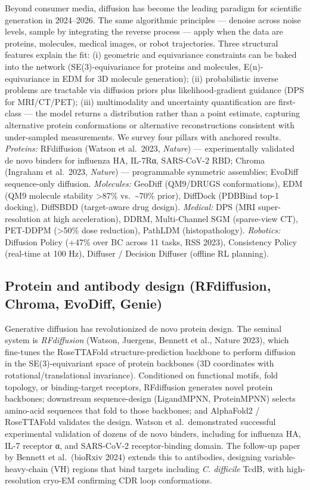Beyond consumer media, diffusion has become the leading paradigm for scientific generation in 2024--2026. The same algorithmic principles --- denoise across noise levels, sample by integrating the reverse process --- apply when the data are proteins, molecules, medical images, or robot trajectories. Three structural features explain the fit: (i) geometric and equivariance constraints can be baked into the network (SE(3)-equivariance for proteins and molecules, E(n)-equivariance in EDM for 3D molecule generation); (ii) probabilistic inverse problems are tractable via diffusion priors plus likelihood-gradient guidance (DPS for MRI/CT/PET); (iii) multimodality and uncertainty quantification are first-class --- the model returns a distribution rather than a point estimate, capturing alternative protein conformations or alternative reconstructions consistent with under-sampled measurements. We survey four pillars with anchored results. \emph{Proteins:} RFdiffusion (Watson et al.~2023, \emph{Nature}) --- experimentally validated de novo binders for influenza HA, IL-7Rα, SARS-CoV-2 RBD; Chroma (Ingraham et al.~2023, \emph{Nature}) --- programmable symmetric assemblies; EvoDiff sequence-only diffusion. \emph{Molecules:} GeoDiff (QM9/DRUGS conformations), EDM (QM9 molecule stability \textgreater87\% vs.~\textasciitilde70\% prior), DiffDock (PDBBind top-1 docking), DiffSBDD (target-aware drug design). \emph{Medical:} DPS (MRI super-resolution at high acceleration), DDRM, Multi-Channel SGM (sparse-view CT), PET-DDPM (\textgreater50\% dose reduction), PathLDM (histopathology). \emph{Robotics:} Diffusion Policy (+47\% over BC across 11 tasks, RSS 2023), Consistency Policy (real-time at 100 Hz), Diffuser / Decision Diffuser (offline RL planning).

\subsection{Protein and antibody design (RFdiffusion, Chroma, EvoDiff, Genie)}\label{protein-and-antibody-design-rfdiffusion-chroma-evodiff-genie}

Generative diffusion has revolutionized de novo protein design. The seminal system is \emph{RFdiffusion} (Watson, Juergens, Bennett et al., Nature 2023), which fine-tunes the RoseTTAFold structure-prediction backbone to perform diffusion in the SE(3)-equivariant space of protein backbones (3D coordinates with rotational/translational invariance). Conditioned on functional motifs, fold topology, or binding-target receptors, RFdiffusion generates novel protein backbones; downstream sequence-design (LigandMPNN, ProteinMPNN) selects amino-acid sequences that fold to those backbones; and AlphaFold2 / RoseTTAFold validates the design. Watson et al.~demonstrated successful experimental validation of dozens of de novo binders, including for influenza HA, IL-7 receptor α, and SARS-CoV-2 receptor-binding domain. The follow-up paper by Bennett et al.~(bioRxiv 2024) extends this to antibodies, designing variable-heavy-chain (VH) regions that bind targets including \emph{C. difficile} TcdB, with high-resolution cryo-EM confirming CDR loop conformations.

